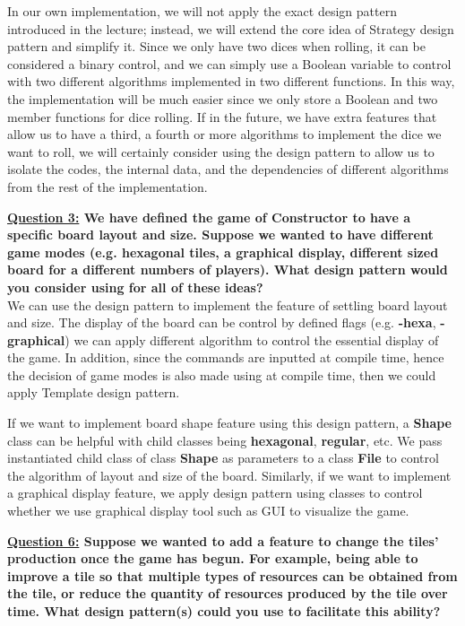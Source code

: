\documentclass[10pt]{article}
\begin{document}
In our own implementation, we will not apply the exact \Strategy design pattern introduced in the lecture; instead, we will extend the core idea of Strategy design pattern and simplify it. Since we only have two dices when rolling, it can be considered a binary control, and we can simply use a Boolean variable to control with two different algorithms implemented in two different functions. In this way, the implementation will be much easier since we only store a Boolean and two member functions for dice rolling. If in the future, we have extra features that allow us to have a third, a fourth or more algorithms to implement the dice we want to roll, we will certainly consider using the \Strategy design pattern to allow us to isolate the codes, the internal data, and the dependencies of different algorithms from the rest of the implementation.

\textbf{\underline{Question 3:} We have defined the game of Constructor to have a specific board layout and size. Suppose we wanted to have different game modes (e.g. hexagonal tiles, a graphical display, different sized board for a different numbers of players). What design pattern would you consider using for all of these ideas?}\\

We can use the \Template design pattern to implement the feature of settling board layout and size. The display of the board can be control by defined flags (e.g. \textbf{-hexa}, \textbf{-graphical}) we can apply different algorithm to control the essential display of the game. In addition, since the commands are inputted at compile time, hence the decision of game modes is also made using at compile time, then we could apply Template design pattern.

If we want to implement board shape feature using this \Template design pattern, a \textbf{Shape} class can be helpful with child classes being \textbf{hexagonal}, \textbf{regular}, etc. We pass instantiated child class of class \textbf{Shape} as parameters to a class \textbf{File} to control the algorithm of layout and size of the board.  Similarly, if we want to implement a graphical display feature, we apply \Template design pattern using classes to control whether we use graphical display tool such as GUI to visualize the game.

\textbf{\underline{Question 6:} Suppose we wanted to add a feature to change the tiles’ production once the game has begun. For example, being able to improve a tile so that multiple types of resources can be obtained from the tile, or reduce the quantity of resources produced by the tile over time. What design pattern(s) could you use to facilitate this ability?}\\
\end{document}

